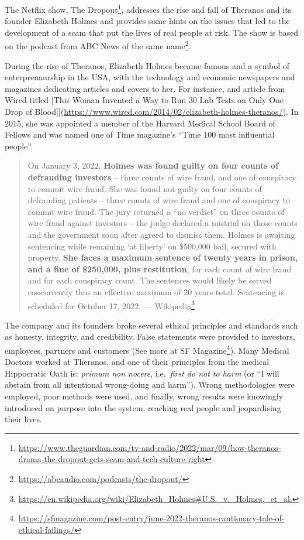 \documentclass[
  12pt,
]{book}
\DeclareRobustCommand{\href}[2]{#2\footnote{\url{#1}}}
\begin{document}
The Netflix show, \href{https://www.theguardian.com/tv-and-radio/2022/mar/09/how-theranos-drama-the-dropout-gets-scam-and-tech-culture-right}{The Dropout}, addresses the rise and fall of Theranos and its founder Elizabeth Holmes and provides some hints on the issues that led to the development of a scam that put the lives of real people at risk. The show is based on the podcast from \href{https://abcaudio.com/podcasts/the-dropout/}{ABC News of the same name}.

During the rise of Theranos, Elizabeth Holmes became famous and a symbol of enterprenaurship in the USA, with the technology and economic newspapers and magazines dedicating articles and covers to her. For instance, and article from Wired titled {[}This Woman Invented a Way to Run 30 Lab Tests on Only One Drop of Blood{]}{]}(\url{https://www.wired.com/2014/02/elizabeth-holmes-theranos/}). In 2015, she was appointed a member of the Harvard Medical School Board of Fellows and was named one of Time magazine's ``Time 100 most influential people''.

\begin{quote}
On January 3, 2022, \textbf{Holmes was found guilty on four counts of defrauding investors} -- three counts of wire fraud, and one of conspiracy to commit wire fraud. She was found not guilty on four counts of defrauding patients -- three counts of wire fraud and one of conspiracy to commit wire fraud. The jury returned a ``no verdict'' on three counts of wire fraud against investors -- the judge declared a mistrial on those counts and the government soon after agreed to dismiss them. Holmes is awaiting sentencing while remaining `at liberty' on \$500,000 bail, secured with property. \textbf{She faces a maximum sentence of twenty years in prison, and a fine of \$250,000, plus restitution}, for each count of wire fraud and for each conspiracy count. The sentences would likely be served concurrently thus an effective maximum of 20 years total. Sentencing is scheduled for October 17, 2022. --- \href{https://en.wikipedia.org/wiki/Elizabeth_Holmes\#U.S._v._Holmes,_et_al.}{Wikipedia}
\end{quote}

The company and its founders broke several ethical principles and standards such as honesty, integrity, and credibility. False statements were provided to investors, employees, partners and customers (See more at \href{https://sfmagazine.com/post-entry/june-2022-theranos-cautionary-tale-of-ethical-failings/}{SF Magazine}). Many Medical Doctors worked at Theranos, and one of their principles from the medical Hippocratic Oath is: \emph{primum non nocere}, i.e.~\emph{first do not to harm} (or ``I will abstain from all intentional wrong-doing and harm''). Wrong methodologies were employed, poor methods were used, and finally, wrong results were knowingly introduced on purpose into the system, reaching real people and jeopardising their lives.
\end{document}
